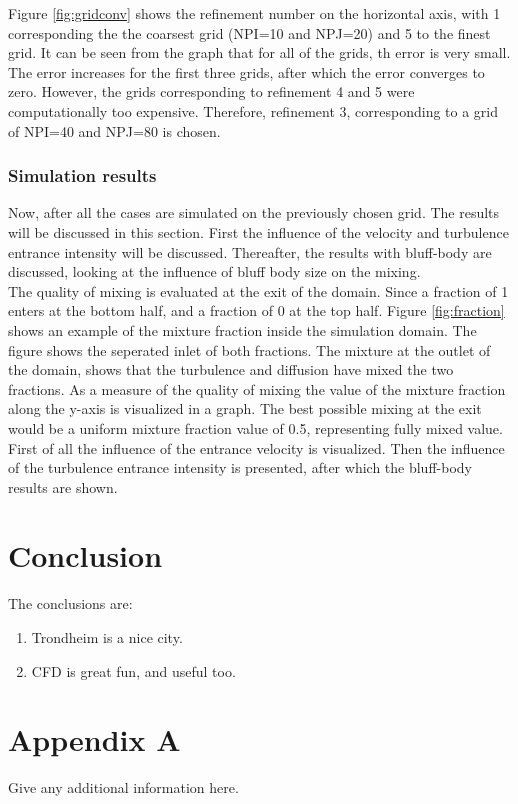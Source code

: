 \documentclass{CFD2017}
\begin{document}

Figure \ref{fig:gridconv} shows the refinement number on the horizontal axis, with 1 corresponding the the coarsest grid (NPI=10 and NPJ=20) and 5 to the finest grid. It can be seen from the graph that for all of the grids, th error is very small. The error increases for the first three grids, after which the error converges to zero. However, the grids corresponding to refinement 4 and 5 were computationally too expensive. Therefore, refinement 3, corresponding to a grid of NPI=40 and NPJ=80 is chosen.

\subsubsection{Simulation results}
Now, after all the cases are simulated on the previously chosen grid. The results will be discussed in this section. First the influence of the velocity and turbulence entrance intensity will be discussed. Thereafter, the results with bluff-body are discussed, looking at the influence of bluff body size on the mixing.\\
The quality of mixing is evaluated at the exit of the domain. Since a fraction of 1 enters at the bottom half, and a fraction of 0 at the top half. Figure \ref{fig:fraction} shows an example of the mixture fraction inside the simulation domain. The figure shows the seperated inlet of both fractions. The mixture at the outlet of the domain, shows that the turbulence and diffusion have mixed the two fractions. As a measure of the quality of mixing the value of the mixture fraction along the y-axis is visualized in a graph. The best possible mixing at the exit would be a uniform mixture fraction value of 0.5, representing fully mixed value.\\
First of all the influence of the entrance velocity is visualized. Then the influence of the turbulence entrance intensity is presented, after which the bluff-body results are shown.




\newpage
{}

\section{Conclusion}
The conclusions are:
\begin{enumerate}
  \item Trondheim is a nice city.
  \item CFD is great fun, and useful too.
\end{enumerate}






\newpage
\section{Appendix A}
Give any additional information here.
\end{document}
